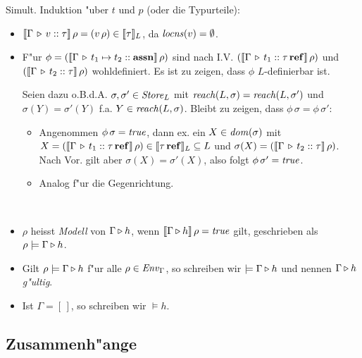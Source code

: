 \documentclass[12pt,a4paper,bigheadings]{scrartcl}
\newcommand{\semantic}[1]{\ensuremath{\llbracket#1\rrbracket}}
\newcommand{\assn}{\ensuremath{\mathbf{assn}}}
\newcommand{\locns}{\name{locns}}
\newcommand{\reach}{\name{reach}}
\begin{document}
\begin{beweis}
  Simult. Induktion "uber $t$ und $p$ (oder die Typurteile):
  \begin{itemize}
    \item $\semantic{\Tj{\Gamma}{v}{\tau}}\,\rho = (v\,\rho) \in \semantic{\tau}_L$, da $\locns(v) = \emptyset$.

    \item F"ur $\phi = (\semantic{\Tj{\Gamma}{t_1 \mapsto t_2}{\assn}}\,\rho)$ sind nach I.V.
          $(\semantic{\Tj{\Gamma}{t_1}{\reftype{\tau}}}\,\rho)$ und $(\semantic{\Tj{\Gamma}{t_2}{\tau}}\,\rho)$
          wohldefiniert. Es ist zu zeigen, dass $\phi$ $L$-definierbar ist.

          Seien dazu o.B.d.A. $\sigma,\sigma'\in{\text{\it Store\/}}_L$ mit $\reach(L,\sigma)=\reach(L,\sigma')$ und
          $\sigma(Y) = \sigma'(Y)$ f.a. $Y\in\reach(L,\sigma)$. Bleibt zu zeigen, dass $\phi\,\sigma=\phi\,\sigma'$:
          \begin{itemize}
            \item Angenommen $\phi\,\sigma={\text{\it true\/}}$, dann ex. ein $X \in {\text{\it dom\/}}(\sigma)$ mit
                  $X=(\semantic{\Tj{\Gamma}{t_1}{\reftype{\tau}}}\,\rho) \in \semantic{\reftype{\tau}}_L \subseteq L$ und
                  $\sigma(X) = (\semantic{\Tj{\Gamma}{t_2}{\tau}}\,\rho)$. Nach Vor. gilt aber $\sigma(X)=\sigma'(X)$,
                  also folgt $\phi\,\sigma'={\text{\it true\/}}$.
            \item Analog f"ur die Gegenrichtung.
          \end{itemize}
  \end{itemize}
\end{beweis}

\begin{definition}[Modell] \
  \begin{itemize}
    \item $\rho$ heisst {\em Modell} von $\Gamma \triangleright h$, wenn $\semantic{\Tjh{\Gamma}{h}}\,\rho = \true$
          gilt, geschrieben als $\rho \models \Gamma \triangleright h$.
    \item Gilt $\rho \models \Gamma \triangleright h$ f"ur alle $\rho\in{\text{\it Env\/}}_\Gamma$, so schreiben wir
          $\models \Gamma \triangleright h$ und nennen  $\Gamma \triangleright h$ {\em g"ultig}.
    \item Ist $\Gamma = [\,]$, so schreiben wir $\models h$.
  \end{itemize}
\end{definition}


\subsection{Zusammenh"ange}
\end{document}
